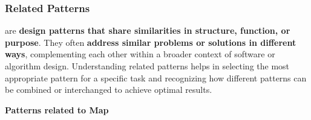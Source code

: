 \subsubsection{Related Patterns}

 are \textbf{design patterns that share similarities in structure, function, or purpose}. They often \textbf{address similar problems or solutions in different ways}, complementing each other within a broader context of software or algorithm design. Understanding related patterns helps in selecting the most appropriate pattern for a specific task and recognizing how different patterns can be combined or interchanged to achieve optimal results.

\highspace
\begin{flushleft}
    \textcolor{Green3}{ \textbf{Patterns related to Map}}
\end{flushleft}
